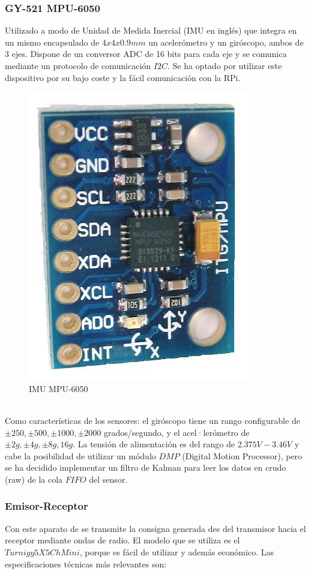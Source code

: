 \documentclass[twoside,11pt]{book}
\begin{document}
\subsubsection*{GY-521 MPU-6050} 
Utilizado a modo de Unidad de Medida Inercial (IMU en inglés) que integra en un mismo encapsulado de $4x4x0.9mm$ un acelerómetro y un giróscopo, ambos de 3 ejes. Dispone de un conversor ADC de 16 bits para cada eje y se comunica mediante un protocolo de comunicación $I2C$. Se ha optado por utilizar este dispositivo por su bajo coste y la fácil comunicación con la RPi.
\begin{figure}[h!]
\begin{center}
\includegraphics[scale=0.12,bb=0 0 366 480]{images/mpu-6050.png} 
\caption{IMU MPU-6050}
\end{center}
\end{figure}\\
Como características de los sensores: el giróscopo tiene un rango configurable de  $\pm250,\pm500,\pm1000,\pm2000$ grados/segundo, y el acel·lerómetro de $\pm2g,\pm4g,\pm8g,16g$. La tensión de alimentación es del rango de $2.375V-3.46V$ y cabe la posibilidad de utilizar un módulo $DMP$ (Digital Motion Processor), pero se ha decidido implementar un filtro de Kalman para leer los datos en crudo (raw) de la cola $FIFO$ del sensor.

\subsubsection*{Emisor-Receptor}
Con este aparato de se transmite la consigna generada des del transmisor hacia el receptor mediante ondas de radio. El modelo que se utiliza es el $Turnigy 5X 5Ch Mini$, porque es fácil de utilizar y además económico. Las especificaciones técnicas más relevantes son: 
\end{document}
